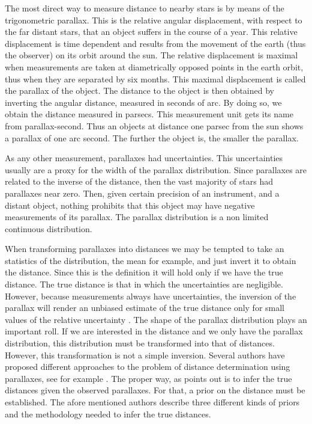 The most direct way to measure distance to nearby stars is by means of the trigonometric parallax. This is the relative angular displacement, with respect to the far distant stars, that an object suffers in the course of a year. This relative displacement is time dependent and results from the movement of the earth (thus the observer) on its orbit around the sun. The relative displacement is maximal when measurements are taken at diametrically opposed points in the earth orbit, thus when they are separated by six months. This maximal displacement is called the parallax of the object. The distance to the object is then obtained by inverting the angular distance, measured in seconds of arc. By doing so, we obtain the distance measured in parsecs. This measurement unit gets its name from parallax-second. Thus an objects at distance one parsec from the sun shows a parallax of one arc second. The further the object is, the smaller the parallax. 

As any other measurement, parallaxes had uncertainties. This uncertainties usually are a proxy for the width of the parallax distribution. Since parallaxes are related to the inverse of the distance, then the vast majority of stars had parallaxes near zero. Then, given certain precision of an instrument, and a distant object, nothing prohibits that this object may have negative measurements of its parallax. The parallax distribution is a non limited continuous distribution. 

When transforming parallaxes into distances we may be tempted to take an statistics of the distribution, the mean for example, and just invert it to obtain the distance. Since this is the definition it will hold only if we have the true distance. The true distance is that in which the uncertainties are negligible. However, because measurements always have uncertainties, the inversion of the parallax will render an unbiased estimate of the true distance only for small values of the relative uncertainty \cite[][mention that a reasonable value is below 0.15-0.20]{Lutz1973}. The shape of the parallax distribution plays an important roll. If we are interested in the distance and we only have the parallax distribution, this distribution must be transformed into that of distances. However, this transformation is not a simple inversion.  
Several authors have proposed different approaches to the problem of distance determination using parallaxes, see for example \citet{Lutz1973,2015PASP..127..994B,2016ApJ...832..137A,2016ApJ...833..119A}. The proper way, as \citet{2015PASP..127..994B} points out is to infer the true distances given the observed parallaxes. For that, a prior on the distance must be established. The afore mentioned authors describe three different kinds of priors and the methodology needed to infer the true distances.

